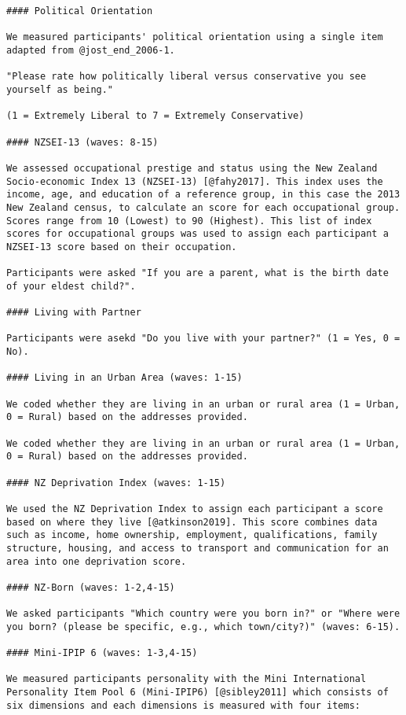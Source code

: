\documentclass[
  singlecolumn]{article}
\begin{document}
\begin{verbatim}
#### Political Orientation

We measured participants' political orientation using a single item adapted from @jost_end_2006-1.

"Please rate how politically liberal versus conservative you see yourself as being."

(1 = Extremely Liberal to 7 = Extremely Conservative)

#### NZSEI-13 (waves: 8-15)

We assessed occupational prestige and status using the New Zealand Socio-economic Index 13 (NZSEI-13) [@fahy2017]. This index uses the income, age, and education of a reference group, in this case the 2013 New Zealand census, to calculate an score for each occupational group. Scores range from 10 (Lowest) to 90 (Highest). This list of index scores for occupational groups was used to assign each participant a NZSEI-13 score based on their occupation.

Participants were asked "If you are a parent, what is the birth date of your eldest child?".

#### Living with Partner

Participants were asekd "Do you live with your partner?" (1 = Yes, 0 = No).

#### Living in an Urban Area (waves: 1-15)

We coded whether they are living in an urban or rural area (1 = Urban, 0 = Rural) based on the addresses provided.

We coded whether they are living in an urban or rural area (1 = Urban, 0 = Rural) based on the addresses provided.

#### NZ Deprivation Index (waves: 1-15)

We used the NZ Deprivation Index to assign each participant a score based on where they live [@atkinson2019]. This score combines data such as income, home ownership, employment, qualifications, family structure, housing, and access to transport and communication for an area into one deprivation score.

#### NZ-Born (waves: 1-2,4-15)

We asked participants "Which country were you born in?" or "Where were you born? (please be specific, e.g., which town/city?)" (waves: 6-15).

#### Mini-IPIP 6 (waves: 1-3,4-15)

We measured participants personality with the Mini International Personality Item Pool 6 (Mini-IPIP6) [@sibley2011] which consists of six dimensions and each dimensions is measured with four items:


\end{verbatim}
\end{document}
